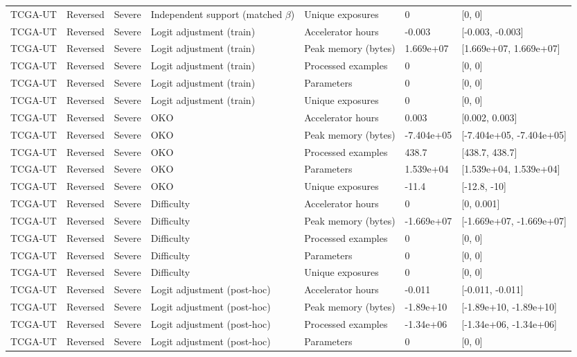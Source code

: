 \begin{longtable}{lllllll}
TCGA-UT & Reversed & Severe & Independent support (matched $\beta$) & Unique exposures & 0 & [0, 0] \\
TCGA-UT & Reversed & Severe & Logit adjustment (train) & Accelerator hours & -0.003 & [-0.003, -0.003] \\
TCGA-UT & Reversed & Severe & Logit adjustment (train) & Peak memory (bytes) & 1.669e+07 & [1.669e+07, 1.669e+07] \\
TCGA-UT & Reversed & Severe & Logit adjustment (train) & Processed examples & 0 & [0, 0] \\
TCGA-UT & Reversed & Severe & Logit adjustment (train) & Parameters & 0 & [0, 0] \\
TCGA-UT & Reversed & Severe & Logit adjustment (train) & Unique exposures & 0 & [0, 0] \\
TCGA-UT & Reversed & Severe & OKO & Accelerator hours & 0.003 & [0.002, 0.003] \\
TCGA-UT & Reversed & Severe & OKO & Peak memory (bytes) & -7.404e+05 & [-7.404e+05, -7.404e+05] \\
TCGA-UT & Reversed & Severe & OKO & Processed examples & 438.7 & [438.7, 438.7] \\
TCGA-UT & Reversed & Severe & OKO & Parameters & 1.539e+04 & [1.539e+04, 1.539e+04] \\
TCGA-UT & Reversed & Severe & OKO & Unique exposures & -11.4 & [-12.8, -10] \\
TCGA-UT & Reversed & Severe & Difficulty & Accelerator hours & 0 & [0, 0.001] \\
TCGA-UT & Reversed & Severe & Difficulty & Peak memory (bytes) & -1.669e+07 & [-1.669e+07, -1.669e+07] \\
TCGA-UT & Reversed & Severe & Difficulty & Processed examples & 0 & [0, 0] \\
TCGA-UT & Reversed & Severe & Difficulty & Parameters & 0 & [0, 0] \\
TCGA-UT & Reversed & Severe & Difficulty & Unique exposures & 0 & [0, 0] \\
TCGA-UT & Reversed & Severe & Logit adjustment (post-hoc) & Accelerator hours & -0.011 & [-0.011, -0.011] \\
TCGA-UT & Reversed & Severe & Logit adjustment (post-hoc) & Peak memory (bytes) & -1.89e+10 & [-1.89e+10, -1.89e+10] \\
TCGA-UT & Reversed & Severe & Logit adjustment (post-hoc) & Processed examples & -1.34e+06 & [-1.34e+06, -1.34e+06] \\
TCGA-UT & Reversed & Severe & Logit adjustment (post-hoc) & Parameters & 0 & [0, 0] \\

\end{longtable}
